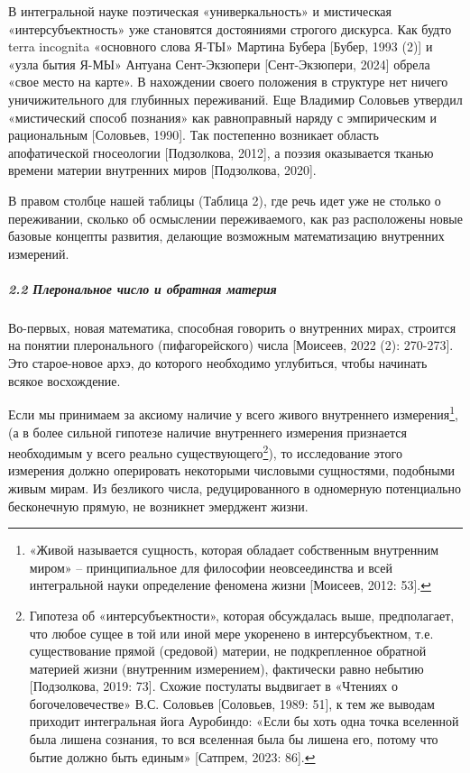     В интегральной науке поэтическая «универкальность» и мистическая «интерсубъектность» уже становятся достояниями строгого дискурса. Как будто terra incognita «основного слова Я-ТЫ» Мартина Бубера [Бубер, 1993 (2)] и «узла бытия Я-МЫ» Антуана Сент-Экзюпери [Сент-Экзюпери, 2024] обрела «свое место на карте». В нахождении своего положения в структуре нет ничего уничижительного для глубинных переживаний. Еще Владимир Соловьев утвердил «мистический способ познания» как равноправный наряду с эмпирическим и рациональным [Соловьев, 1990]. Так постепенно возникает область апофатической гносеологии [Подзолкова, 2012], а поэзия оказывается тканью времени материи внутренних миров [Подзолкова, 2020].

    В правом столбце нашей таблицы (Таблица 2), где речь идет уже не столько о переживании, сколько об осмыслении переживаемого, как раз расположены новые базовые концепты развития, делающие возможным математизацию внутренних измерений.

    \subparagraph*{2.2 Плерональное число и обратная материя}
    Во-первых, новая математика, способная говорить о внутренних мирах, строится на понятии плеронального (пифагорейского) числа [Моисеев, 2022 (2): 270-273]. Это старое-новое архэ, до которого необходимо углубиться, чтобы начинать всякое восхождение.

    Если мы принимаем за аксиому наличие у всего живого внутреннего измерения\footnote{«Живой называется сущность, которая обладает собственным внутренним миром» – принципиальное для философии неовсеединства и всей интегральной науки определение феномена жизни [Моисеев, 2012: 53].}, (а в более сильной гипотезе наличие внутреннего измерения признается необходимым у всего реально существующего\footnote{Гипотеза об «интерсубъектности», которая обсуждалась выше, предполагает, что любое сущее в той или иной мере укоренено в интерсубъектном, т.е. существование прямой (средовой) материи, не подкрепленное обратной материей жизни (внутренним измерением), фактически равно небытию [Подзолкова, 2019: 73]. Схожие постулаты выдвигает в «Чтениях о богочеловечестве» В.С. Соловьев [Соловьев, 1989: 51], к тем же выводам приходит интегральная йога Ауробиндо: «Если бы хоть одна точка вселенной была лишена сознания, то вся вселенная была бы лишена его, потому что бытие должно быть единым» [Сатпрем, 2023: 86].}), то исследование этого измерения должно оперировать некоторыми числовыми сущностями, подобными живым мирам. Из безликого числа, редуцированного в одномерную потенциально бесконечную прямую, не возникнет эмерджент жизни.

